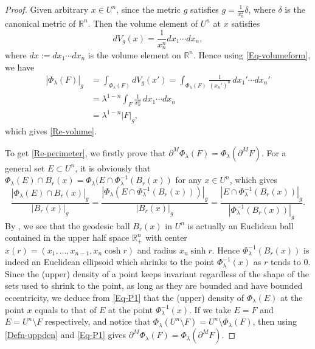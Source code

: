 \documentclass[11pt,reqno]{amsart}
\theoremstyle{definition}
\theoremstyle{remark}
\numberwithin{equation}{section}
\renewcommand{\(}{\left(}
\renewcommand{\)}{\right)}
\renewcommand{\-}{\overline}
\begin{document}
\begin{proof}
	Given arbitrary $x\in U^n$, since the metric $g$ satisfies $g=\frac{1}{x_n^2}\delta$, where $\delta$ is the canonical metric of $\mathbb{R}^n$. Then the volume element of $U^n$ at $x$ satisfies
	\begin{equation}\label{Eq-volumeform}
		dV_g(x)=\frac{1}{x_n^n}dx_1\cdots dx_n,
	\end{equation}
	where $dx:=dx_1\cdots dx_n$ is the volume element on $\mathbb{R}^n$. Hence using \eqref{Eq-volumeform}, we have
	\begin{align*}
		|\Phi_{\lambda}(F)|_g&=\int_{\Phi_{\lambda}(F)}{dV_g(x')}=\int_{\Phi_{\lambda}(F)}{\frac{1}{(x_n')^n}}\,dx_1'\cdots dx_n'\\
		&=\lambda^{1-n}\int_F{\frac{1}{x_n^n}}\,dx_1\cdots dx_n\\
		&=\lambda^{1-n}|F|_g,
	\end{align*}
which gives \eqref{Re-volume}.

To get \eqref{Re-perimeter}, we firstly prove that $\partial^M \Phi_{\lambda}(F)=\Phi_{\lambda}(\partial^M F)$. For a general set $E\subset U^n$, it is obviously that $\Phi_{\lambda}(E)\cap B_r(x)=\Phi_{\lambda}(E\cap\Phi_{\lambda}^{-1}(B_r(x))$ for any $x\in U^n$, which gives
\begin{equation}\label{Eq-P1}
	\frac{|\Phi_{\lambda}(E)\cap B_r(x)|_g}{|B_r(x)|_g}=\frac{|\Phi_{\lambda}(E\cap\Phi_{\lambda}^{-1}(B_r(x)))|_g}{|B_r(x)|_g}=\frac{|E\cap\Phi_{\lambda}^{-1}(B_r(x))|_g}{|\Phi_{\lambda}^{-1}(B_r(x))|_g}.
\end{equation} 
By \cite[Theorem 4.6.4; Exercise 4.6.6]{Ratcliffe19}, we see that the geodesic ball $B_r(x)$ in $U^n$ is actually an Euclidean ball contained in the upper half space $\mathbb{R}^n_{+}$ with center $x(r)=(x_1,\dots,x_{n-1},x_n\cosh r)$ and radius $x_n\sinh r$. Hence $\Phi_{\lambda}^{-1}(B_r(x))$ is indeed an Euclidean ellipsoid which shrinks to the point $\Phi_{\lambda}^{-1}(x)$ as $r$ tends to 0. Since the (upper) density of a point keeps invariant regardless of the shape of the sets used to shrink to the point, as long as they are bounded and have bounded eccentricity, we deduce from \eqref{Eq-P1} that the (upper) density of $\Phi_{\lambda}(E)$ at the point $x$ equals to that of $E$ at the point $\Phi_{\lambda}^{-1}(x)$. If we take $E=F$ and $E=U^n\setminus F$ respectively, and notice that $\Phi_{\lambda}(U^n\setminus F)=U^n\setminus{\Phi_{\lambda}(F)}$, then using \eqref{Defn-uppden} and \eqref{Eq-P1} gives $\partial^M \Phi_{\lambda}(F)=\Phi_{\lambda}(\partial^M F)$.


\end{proof}
\end{document}
